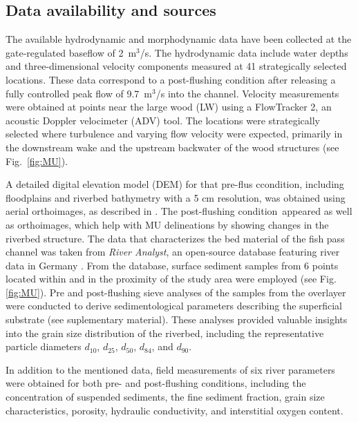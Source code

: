 \documentclass[draft,linenumbers,onecolumn]{agujournal2019} %
\begin{document}
\subsection{Data availability and sources}
\label{sec:Sec2.3}
The available hydrodynamic and morphodynamic data have been collected at the gate-regulated baseflow of 2~m$^3$/s. 
The hydrodynamic data include water depths and three-dimensional velocity components measured at 41 strategically selected locations. 
These data correspond to a post-flushing condition after releasing a fully controlled peak flow of 9.7~m$^3$/s into the channel. 
Velocity measurements were obtained at points near the large wood (LW) using a FlowTracker 2, an acoustic Doppler velocimeter (ADV) tool. 
The locations were strategically selected where turbulence and varying flow velocity were expected, primarily in the downstream wake and the upstream backwater of the wood structures \cite{schalko2024flow}(see Fig.~\ref{fig:MU}). 

A detailed digital elevation model (DEM) for that pre-flus ccondition, including floodplains and riverbed bathymetry with a 5 cm resolution, was obtained using aerial orthoimages, as described in \cite{schwindt2023fuzzylogic}. The post-flushing condition appeared as well as orthoimages, which help with MU delineations by showing changes in the riverbed structure. The data that characterizes the bed material of the fish pass channel was taken from \textit{River Analyst}, an open-source database featuring river data in Germany \cite{negreiros2023database}. From the database, surface sediment samples from 6 points located within and in the proximity of the study area were employed (see Fig. \ref{fig:MU}). Pre and post-flushing sieve analyses of the samples from the overlayer were conducted to derive sedimentological parameters describing the superficial substrate (see suplementary material). These analyses provided valuable insights into the grain size distribution of the riverbed, including the representative particle diameters \(d_{10}\), \(d_{25}\), \(d_{50}\), \(d_{84}\), and \(d_{90}\).


In addition to the mentioned data, field measurements of six river parameters were obtained for both pre- and post-flushing conditions, including the concentration of suspended sediments, the fine sediment fraction, grain size characteristics, porosity, hydraulic conductivity, and interstitial oxygen content. 
\end{document}
